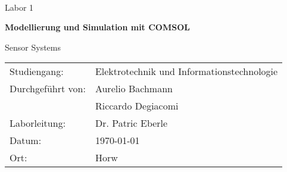 \begin{titlepage}
    \begin{center}
    \end{center}
    \begin{center}
    \end{center}
    \begin{center}
        \vspace{10mm}
        \hrulefill\\
        \vspace{5mm}
        {\Huge Labor 1\\}
        {\Huge\bfseries Modellierung und Simulation mit COMSOL\par}
        \vspace{1cm}
        {\huge Sensor Systems\par}
        \vspace{5mm}
        \hrulefill
    \end{center}

    \vfill

    \begin{center}

        
    \end{center}
    
    \vfill

    \begin{flushleft}
    \begin{tabular}{ll}
        Studiengang:        & Elektrotechnik und Informationstechnologie \\ [5mm]
        Durchgeführt von:    & Aurelio Bachmann\\ 
                             & Riccardo Degiacomi \\[3mm]
        Laborleitung:        & Dr. Patric Eberle \\ [5mm]

        Datum:   & \today \\ 
        Ort:     & Horw
    \end{tabular}
    \end{flushleft}
        \thispagestyle{empty}
\end{titlepage}